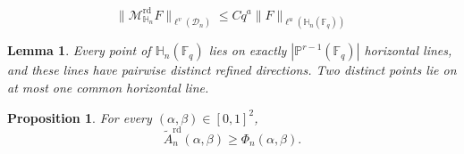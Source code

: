\documentclass[10pt,a4paper]{amsart}
\newtheorem{lemma}{Lemma}
\newtheorem{proposition}{Proposition}
\newcommand{\Dn}{\mathcal D_n}
\newcommand{\Fq}{\mathbb F_q}
\newcommand{\HH}{\mathbb H}
\newcommand{\Mrd}{\mathcal M^{\mathrm{rd}}_{\HH_n}}
\newcommand{\PP}{\mathbb P}
\newcommand{\norm}[1]{\lVert #1\rVert}
\begin{document}
\begin{equation}\label{eq:def-critical-exponent}
 \norm{\Mrd F}_{\ell^v(\Dn)}
 \leq
 Cq^a
 \norm{F}_{\ell^u(\HH_n(\Fq))}
\end{equation}

\begin{lemma}\label{lem:line-geometry}
Every point of $\HH_n(\Fq)$ lies on exactly $|\PP^{r-1}(\Fq)|$ horizontal lines, and these lines have pairwise distinct refined directions. Two distinct points lie on at most one common horizontal line.
\end{lemma}

\begin{proposition}\label{prop:lower-bounds}
For every $(\alpha,\beta)\in[0,1]^2$,
\begin{equation}\label{eq:lower-bounds}
 \widetilde A_n^{\mathrm{rd}}(\alpha,\beta)
 \geq\Phi_n(\alpha,\beta).
\end{equation}
\end{proposition}
\end{document}
